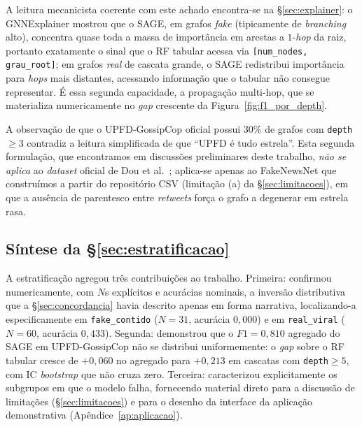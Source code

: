 A leitura mecanicista coerente com este achado encontra-se na
\S\ref{sec:explainer}: o GNNExplainer mostrou que o SAGE, em grafos
\emph{fake} (tipicamente de \emph{branching} alto), concentra quase
toda a massa de import\^ancia em arestas a $1$-\emph{hop} da raiz,
portanto exatamente o sinal que o RF tabular acessa via
\texttt{[num\_nodes, grau\_root]}; em grafos \emph{real} de cascata
grande, o SAGE redistribui import\^ancia para \emph{hops} mais distantes,
acessando informa\c{c}\~ao que o tabular n\~ao consegue representar.
\'E essa segunda capacidade, a propaga\c{c}\~ao multi-hop,
que se materializa numericamente no \emph{gap} crescente da
Figura~\ref{fig:f1_por_depth}.

A observa\c{c}\~ao de que o UPFD-GossipCop oficial possui $30\%$ de grafos com
\texttt{depth} $\geq 3$ contradiz a leitura simplificada de que
``UPFD \'e tudo estrela''. Esta segunda formula\c{c}\~ao, que
encontramos em discuss\~oes preliminares deste trabalho, \emph{n\~ao se aplica}
ao \emph{dataset} oficial de Dou et
al.~\cite{dou2021upfd}; aplica-se apenas ao FakeNewsNet que
constru\'imos a partir do reposit\'orio CSV (limita\c{c}\~ao (a) da
\S\ref{sec:limitacoes}), em que a aus\^encia de parentesco entre
\emph{retweets} for\c{c}a o grafo a degenerar em estrela rasa.

\subsection*{S\'intese da \S \ref{sec:estratificacao}}

A estratifica\c{c}\~ao agregou tr\^es contribui\c{c}\~oes ao trabalho. Primeira:
confirmou numericamente, com $N$s expl\'icitos e
acur\'acias nominais, a invers\~ao distributiva que a
\S\ref{sec:concordancia} havia descrito apenas em forma
narrativa, localizando-a especificamente em \texttt{fake\_contido}
($N=31$, acur\'acia $0{,}000$) e em \texttt{real\_viral} ($N=60$,
acur\'acia $0{,}433$).
Segunda: demonstrou que o $F1 = 0{,}810$ agregado do SAGE em
UPFD-GossipCop n\~ao se distribui uniformemente: o \emph{gap} sobre o
RF tabular cresce de $+0{,}060$ no agregado para $+0{,}213$ em
cascatas com \texttt{depth}$\geq 5$, com IC \emph{bootstrap} que
n\~ao cruza zero. Terceira: caracterizou explicitamente os subgrupos
em que o modelo falha, fornecendo material direto para a
discuss\~ao de limita\c{c}\~oes (\S\ref{sec:limitacoes}) e para o
desenho da interface da aplica\c{c}\~ao demonstrativa
(Ap\^endice~\ref{ap:aplicacao}).

